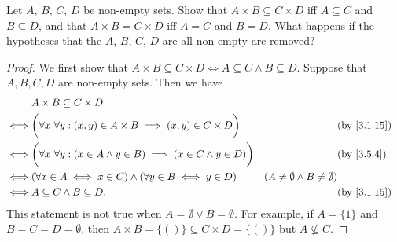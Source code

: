 \begin{ex}\label{ex:3.5.6}
  Let \(A\), \(B\), \(C\), \(D\) be non-empty sets.
  Show that \(A \times B \subseteq C \times D\) iff \(A \subseteq C\) and \(B \subseteq D\), and that \(A \times B = C \times D\) iff \(A = C\) and \(B = D\).
  What happens if the hypotheses that the \(A\), \(B\), \(C\), \(D\) are all non-empty are removed?
\end{ex}

\begin{proof}
  We first show that \(A \times B \subseteq C \times D \iff A \subseteq C \land B \subseteq D\).
  Suppose that \(A, B, C, D\) are non-empty sets.
  Then we have
  \begin{align*}
         & A \times B \subseteq C \times D                                                                                                                       \\
    \iff & \bigg(\forall x \ \forall y : (x, y) \in A \times B \implies (x, y) \in C \times D\bigg)    &                                           & \by{3.1.15} \\
    \iff & \bigg(\forall x \ \forall y :(x \in A \land y \in B) \implies (x \in C \land y \in D)\bigg) &                                           & \by{3.5.4}  \\
    \iff & (\forall x \in A \iff x \in C) \land (\forall y \in B \iff y \in D)                         & (A \neq \emptyset \land B \neq \emptyset)               \\
    \iff & A \subseteq C \land B \subseteq D.                                                          &                                           & \by{3.1.15}
  \end{align*}
  This statement is not true when \(A = \emptyset \lor B = \emptyset\).
  For example, if \(A = \{1\}\) and \(B = C = D = \emptyset\), then \(A \times B = \{()\} \subseteq C \times D = \{()\}\) but \(A \not \subseteq C\).


\end{proof}
